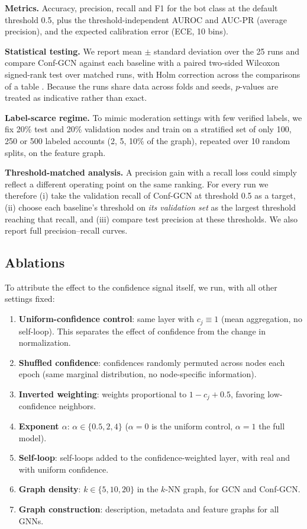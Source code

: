 \documentclass{csimq}
\begin{document}
\textbf{Metrics.} Accuracy, precision, recall and F1 for the bot class at the default threshold 0.5, plus the threshold-independent AUROC and AUC-PR (average precision), and the expected calibration error (ECE, 10 bins).

\textbf{Statistical testing.} We report mean $\pm$ standard deviation over the 25 runs and compare Conf-GCN against each baseline with a paired two-sided Wilcoxon signed-rank test over matched runs, with Holm correction across the comparisons of a table \cite{demsar2006statistical,holm1979simple}. Because the runs share data across folds and seeds, $p$-values are treated as indicative rather than exact.

\textbf{Label-scarce regime.} To mimic moderation settings with few verified labels, we fix 20\% test and 20\% validation nodes and train on a stratified set of only 100, 250 or 500 labeled accounts (2, 5, 10\% of the graph), repeated over 10 random splits, on the feature graph.

\textbf{Threshold-matched analysis.} A precision gain with a recall loss could simply reflect a different operating point on the same ranking. For every run we therefore (i) take the validation recall of Conf-GCN at threshold 0.5 as a target, (ii) choose each baseline's threshold on \emph{its validation set} as the largest threshold reaching that recall, and (iii) compare test precision at these thresholds. We also report full precision--recall curves.

\subsection{Ablations}
\label{sec:ablations}
To attribute the effect to the confidence signal itself, we run, with all other settings fixed:
\begin{enumerate}
\item \textbf{Uniform-confidence control}: same layer with $c_j\equiv1$ (mean aggregation, no self-loop). This separates the effect of confidence from the change in normalization.
\item \textbf{Shuffled confidence}: confidences randomly permuted across nodes each epoch (same marginal distribution, no node-specific information).
\item \textbf{Inverted weighting}: weights proportional to $1-c_j+0.5$, favoring low-confidence neighbors.
\item \textbf{Exponent $\alpha$}: $\alpha\in\{0.5,2,4\}$ ($\alpha=0$ is the uniform control, $\alpha=1$ the full model).
\item \textbf{Self-loop}: self-loops added to the confidence-weighted layer, with real and with uniform confidence.
\item \textbf{Graph density}: $k\in\{5,10,20\}$ in the $k$-NN graph, for GCN and Conf-GCN.
\item \textbf{Graph construction}: description, metadata and feature graphs for all GNNs.
\end{enumerate}
\end{document}
